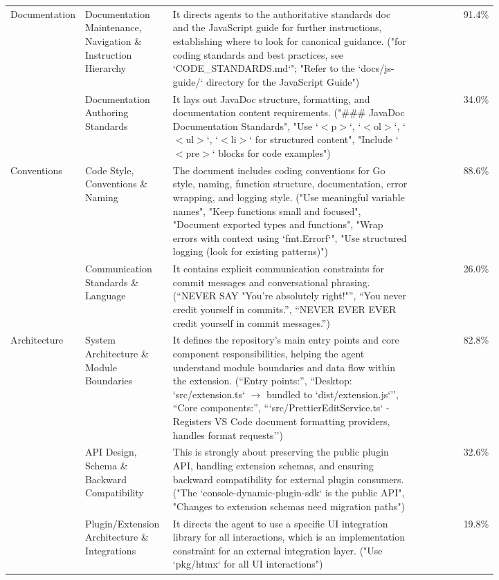 {\begin{longtable}{|p{0.14\linewidth}|p{0.18\linewidth}|p{0.5\linewidth}|r|}
\hline
\multirow{2}{=}{\centering Documentation} & Documentation Maintenance, Navigation \& Instruction Hierarchy & It directs agents to the authoritative standards doc and the JavaScript guide for further instructions, establishing where to look for canonical guidance. ("for coding standards and best practices, see `CODE\_STANDARDS.md`"; "Refer to the `docs/js-guide/` directory for the JavaScript Guide") & 91.4\% \\
\hhline{~||-|-|-|}
 & Documentation Authoring Standards & It lays out JavaDoc structure, formatting, and documentation content requirements. ("\#\#\# JavaDoc Documentation Standards", "Use `$<$p$>$`, `$<$ol$>$`, `$<$ul$>$`, `$<$li$>$` for structured content", "Include `$<$pre$>$` blocks for code examples") & 34.0\% \\
\hline
\multirow{2}{=}{\centering Conventions} & Code Style, Conventions \& Naming & The document includes coding conventions for Go style, naming, function structure, documentation, error wrapping, and logging style. ("Use meaningful variable names", "Keep functions small and focused", "Document exported types and functions", "Wrap errors with context using `fmt.Errorf`", "Use structured logging (look for existing patterns)") & 88.6\% \\
\hhline{~||-|-|-|}
 & Communication Standards \& Language & It contains explicit communication constraints for commit messages and conversational phrasing. (``NEVER SAY "You're absolutely right!"'', ``You never credit yourself in commits.'', ``NEVER EVER EVER credit yourself in commit messages.'') & 26.0\% \\
\hline
\multirow{4}{=}{\centering Architecture} & System Architecture \& Module Boundaries & It defines the repository’s main entry points and core component responsibilities, helping the agent understand module boundaries and data flow within the extension. (``Entry points:'', ``Desktop: `src/extension.ts` $\rightarrow$ bundled to `dist/extension.js`'', ``Core components:'', ```src/PrettierEditService.ts` - Registers VS Code document formatting providers, handles format requests'') & 82.8\% \\
\hhline{~||-|-|-|}
 & API Design, Schema \& Backward Compatibility & This is strongly about preserving the public plugin API, handling extension schemas, and ensuring backward compatibility for external plugin consumers. ("The `console-dynamic-plugin-sdk` is the public API", "Changes to extension schemas need migration paths") & 32.6\% \\
\hhline{~||-|-|-|}
 & Plugin/Extension Architecture \& Integrations & It directs the agent to use a specific UI integration library for all interactions, which is an implementation constraint for an external integration layer. ("Use `pkg/htmx` for all UI interactions") & 19.8\% \\

\end{longtable}}
